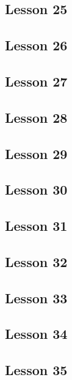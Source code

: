 \documentclass[a4paper,11pt]{article}
\begin{document}
\subsection{Lesson 25}


\subsection{Lesson 26}


\subsection{Lesson 27}


\subsection{Lesson 28}


\subsection{Lesson 29}


\subsection{Lesson 30}


\subsection{Lesson 31}


\subsection{Lesson 32}


\subsection{Lesson 33}


\subsection{Lesson 34}


\subsection{Lesson 35}
\end{document}
